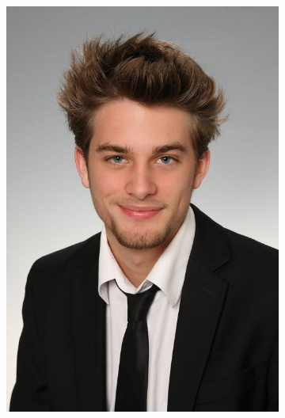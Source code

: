 \documentclass[FIPLY_base.tex]{subfiles}
\begin{document}
\begin{figure}[H]
\begin{subfigure}[b]{0.2\textwidth}
			\includegraphics[scale=0.2]{img/dani}
		\end{subfigure}
	\end{figure}
	
\end{document}
